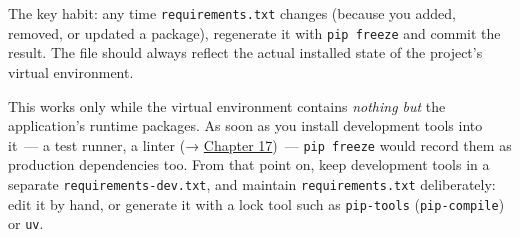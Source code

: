 \begin{codebox}

\begin{Shaded}
\begin{Highlighting}[]
 

\OperatorTok{\textgreater{}}
 


\OperatorTok{\textgreater{}}
 
\end{Highlighting}
\end{Shaded}

\end{codebox}

\noindent{}The key habit: any time \texttt{requirements.txt} changes (because you added, removed, or updated a package), regenerate it with \texttt{pip\ freeze} and commit the result. The file should always reflect the actual installed state of the project's virtual environment.

This works only while the virtual environment contains \emph{nothing but} the application's runtime packages. As soon as you install development tools into it~--- a test runner, a linter (→ \hyperref[ch:17-build-process]{Chapter 17})~--- \texttt{pip\ freeze} would record them as production dependencies too. From that point on, keep development tools in a separate \texttt{requirements-dev.txt}, and maintain \texttt{requirements.txt} deliberately: edit it by hand, or generate it with a lock tool such as \texttt{pip-tools} (\texttt{pip-compile}) or \texttt{uv}.

